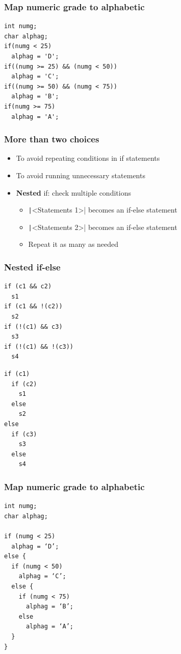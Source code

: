\documentclass{../c-lecture}
\begin{document}
\begin{frame}[fragile]
  \frametitle{Map numeric grade to alphabetic}
  \begin{verbatim}
int numg;
char alphag;
if(numg < 25)
  alphag = 'D';
if((numg >= 25) && (numg < 50))
  alphag = 'C';
if((numg >= 50) && (numg < 75))
  alphag = 'B';
if(numg >= 75)
  alphag = 'A';
  \end{verbatim}
\end{frame}

\begin{frame}
  \frametitle{More than two choices}
  \begin{itemize}
    \item To avoid repeating conditions in if statements
    \item To avoid running unnecessary statements
    \item \textbf{\color{RubineRed} Nested} if: check multiple conditions
    \begin{itemize}
      \item \texttt|<Statements 1>| becomes an if-else statement
      \item \texttt|<Statements 2>| becomes an if-else statement
      \item Repeat it as many as needed
    \end{itemize}
  \end{itemize}
\end{frame}

\begin{frame}[fragile]
  \frametitle{Nested if-else}
  \scriptsize
  \begin{verbatim}
if (c1 && c2)
  s1
if (c1 && !(c2))
  s2
if (!(c1) && c3)
  s3
if (!(c1) && !(c3))
  s4
  \end{verbatim}
  \scriptsize
  \begin{verbatim}
if (c1)
  if (c2)
    s1
  else
    s2
else
  if (c3)
    s3
  else
    s4
  \end{verbatim}
\end{frame}

\begin{frame}[fragile]
  \frametitle{Map numeric grade to alphabetic}
  \scriptsize
  \begin{verbatim}
int numg;
char alphag;

if (numg < 25)
  alphag = ‘D’;
else {
  if (numg < 50)
    alphag = ‘C’;
  else {
    if (numg < 75)
      alphag = ‘B’;
    else
      alphag = ‘A’;
  }
}
  \end{verbatim}
\end{frame}
\end{document}
